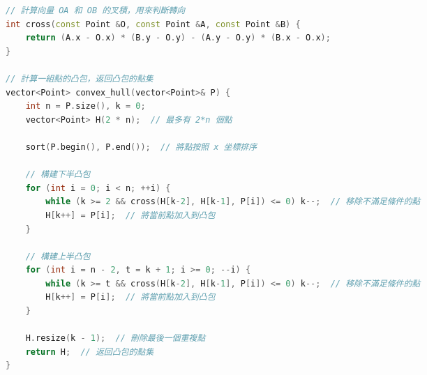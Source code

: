 \documentclass{article}
\begin{document}
\begin{multicols}{2}
\begin{lstlisting}[language=C++]
// 計算向量 OA 和 OB 的叉積，用來判斷轉向
int cross(const Point &O, const Point &A, const Point &B) {
    return (A.x - O.x) * (B.y - O.y) - (A.y - O.y) * (B.x - O.x);
}

// 計算一組點的凸包，返回凸包的點集
vector<Point> convex_hull(vector<Point>& P) {
    int n = P.size(), k = 0;
    vector<Point> H(2 * n);  // 最多有 2*n 個點

    sort(P.begin(), P.end());  // 將點按照 x 坐標排序

    // 構建下半凸包
    for (int i = 0; i < n; ++i) {
        while (k >= 2 && cross(H[k-2], H[k-1], P[i]) <= 0) k--;  // 移除不滿足條件的點
        H[k++] = P[i];  // 將當前點加入到凸包
    }

    // 構建上半凸包
    for (int i = n - 2, t = k + 1; i >= 0; --i) {
        while (k >= t && cross(H[k-2], H[k-1], P[i]) <= 0) k--;  // 移除不滿足條件的點
        H[k++] = P[i];  // 將當前點加入到凸包
    }

    H.resize(k - 1);  // 刪除最後一個重複點
    return H;  // 返回凸包的點集
}
\end{lstlisting}


\end{multicols}
\end{document}
